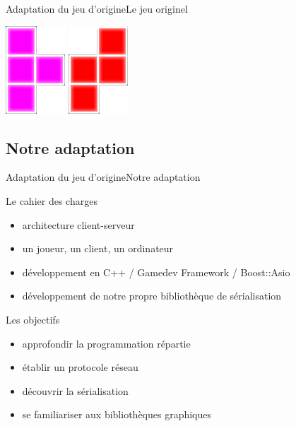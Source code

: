 \documentclass[french]{beamer}
\begin{document}
\begin{frame}{Adaptation du jeu d'origine}{Le jeu originel}
\begin{center}
		\includegraphics[scale=0.3]{img/6.png}
		\includegraphics[scale=0.3]{img/7.png}
	\end{center}
\end{frame}

	\subsection{Notre adaptation}

\begin{frame}{Adaptation du jeu d'origine}{Notre adaptation}
	
	\begin{block}{Le cahier des charges}
		\begin{itemize}
			\item architecture client-serveur
			\item un joueur, un client, un ordinateur
			\item développement en C++ / Gamedev Framework / Boost::Asio
			\item développement de notre propre bibliothèque de sérialisation
		\end{itemize}
	\end{block}
	
	\begin{block}{Les objectifs}
		\begin{itemize}
			\item approfondir la programmation répartie
			\item établir un protocole réseau
			\item découvrir la sérialisation
			\item se familiariser aux bibliothèques graphiques
		\end{itemize}
	\end{block}

\end{frame}
\end{document}
